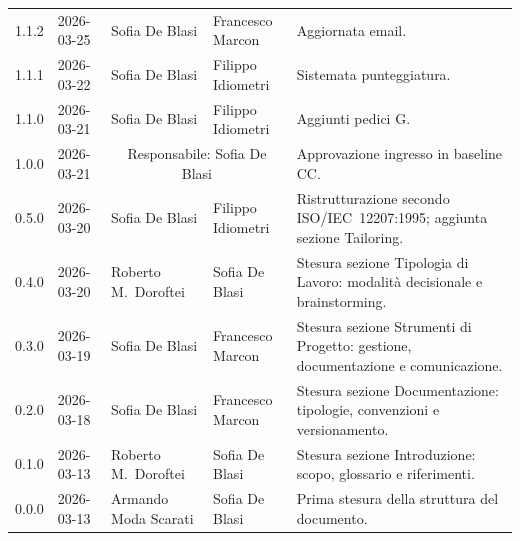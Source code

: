 \begin{longtable}{>{\ttfamily\small}l l l l p{4cm}}
  1.1.2 & 2026-03-25 & Sofia De Blasi & Francesco Marcon & Aggiornata email. \\[4pt]
  1.1.1 & 2026-03-22 & Sofia De Blasi & Filippo Idiometri & Sistemata punteggiatura. \\[4pt]
  1.1.0 & 2026-03-21 & Sofia De Blasi & Filippo Idiometri & Aggiunti pedici G. \\[4pt]
  1.0.0 & 2026-03-21 & \multicolumn{2}{c}{Responsabile: Sofia De Blasi} & Approvazione ingresso in baseline CC. \\[4pt]
  0.5.0 & 2026-03-20 & Sofia De Blasi       & Filippo Idiometri & Ristrutturazione secondo ISO/IEC~12207:1995; aggiunta sezione Tailoring. \\[4pt]
  0.4.0 & 2026-03-20 & Roberto M.\ Doroftei & Sofia De Blasi & Stesura sezione Tipologia di Lavoro: modalità decisionale e brainstorming. \\[4pt]
  0.3.0 & 2026-03-19 & Sofia De Blasi       & Francesco Marcon & Stesura sezione Strumenti di Progetto: gestione, documentazione e comunicazione. \\[4pt]
  0.2.0 & 2026-03-18 & Sofia De Blasi       & Francesco Marcon & Stesura sezione Documentazione: tipologie, convenzioni e versionamento. \\[4pt]
  0.1.0 & 2026-03-13 & Roberto M.\ Doroftei & Sofia De Blasi & Stesura sezione Introduzione: scopo, glossario e riferimenti. \\[4pt]
  0.0.0 & 2026-03-13 & Armando Moda Scarati & Sofia De Blasi & Prima stesura della struttura del documento. \\
  \bottomrule
\end{longtable}